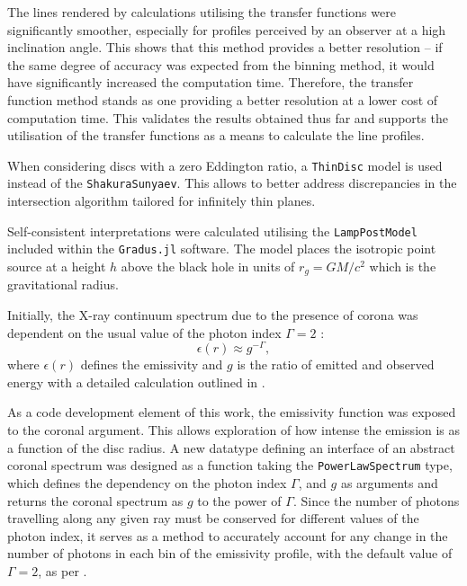 \documentclass[fleqn,usenatbib,useAMS]{mnras}
\begin{document}
The lines rendered by calculations utilising the transfer functions were significantly smoother, especially for profiles perceived by an observer at a high inclination angle. This shows that this method provides a better resolution -- if the same degree of accuracy was expected from the binning method, it would have significantly increased the computation time. Therefore, the transfer function method stands as one providing a better resolution at a lower cost of computation time. This validates the results obtained thus far and supports the utilisation of the transfer functions as a means to calculate the line profiles.

When considering discs with a zero Eddington ratio, a {\tt ThinDisc} model is used instead of the {\tt ShakuraSunyaev}. This allows to better address discrepancies in the intersection algorithm tailored for infinitely thin planes. 

Self-consistent interpretations were calculated utilising the {\tt LampPostModel} included within the {\tt Gradus.jl} software. The model places the isotropic point source at a height $h$ above the black hole in units of $r_{g} = GM/c^{2}$ which is the gravitational radius. 

Initially, the X-ray continuum spectrum due to the presence of corona was dependent on the usual value of the photon index $\Gamma = 2$ \cite{wilkins2012understanding}:
%
\begin{equation}
    \epsilon(r) \approx g^{-\Gamma},
    \label{emissivity}
\end{equation}
%
where $\epsilon(r)$ defines the emissivity and $g$ is the ratio of emitted and observed energy with a detailed calculation outlined in \cite{wilkins2012understanding}.

As a code development element of this work, the emissivity function was exposed to the coronal argument. This allows exploration of how intense the emission is as a function of the disc radius. A new datatype defining an interface of an abstract coronal spectrum was designed as a function taking the {\tt PowerLawSpectrum} type, which defines the dependency on the photon index $\Gamma$, and $g$ as arguments and returns the coronal 
spectrum as $g$ to the power of $\Gamma$. Since the number of photons travelling along any given ray must be conserved for different values of the photon index, it serves as a method to accurately account for any change in the number of photons in each bin of the emissivity profile, with the default value of $\Gamma = 2$, as per \cite{gonzalez2017probing}. 
\end{document}
